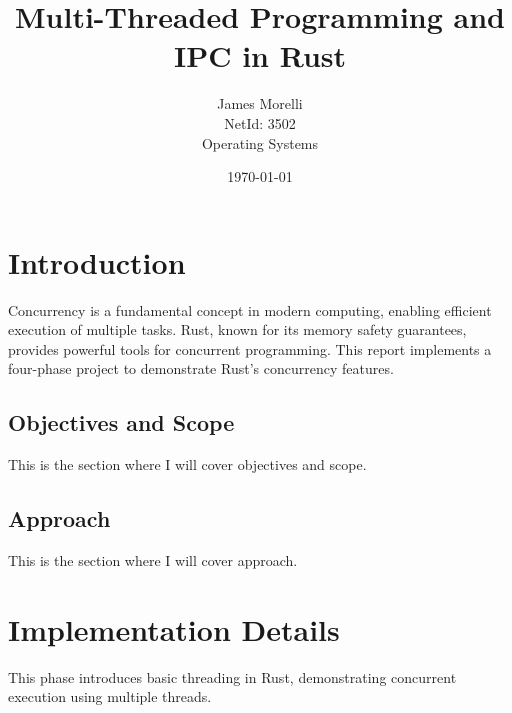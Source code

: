 \documentclass{report}
\begin{document}
\title{Multi-Threaded Programming
and IPC in Rust}
\author{James Morelli \\ \small NetId: 3502 \\ \small Operating Systems}
\date{\today}

\maketitle
\tableofcontents
\chapter{Introduction}
Concurrency is a fundamental concept in modern computing, enabling efficient execution of multiple tasks. Rust, known for its memory safety guarantees, provides powerful tools for concurrent programming. This report implements a four-phase project to demonstrate Rust's concurrency features.
\section*{Objectives and Scope}
This is the section where I will cover objectives and scope.
\section*{Approach}
This is the section where I will cover approach.
\chapter{Implementation Details}
This phase introduces basic threading in Rust, demonstrating concurrent execution using multiple threads.
\end{document}
